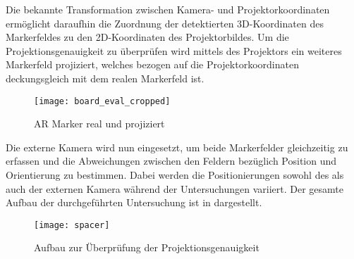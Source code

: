 Die bekannte Transformation zwischen Kamera- und Projektorkoordinaten ermöglicht daraufhin die Zuordnung der detektierten 3D-Koordinaten des Markerfeldes zu den 2D-Koordinaten des Projektorbildes. Um die Projektionsgenauigkeit zu überprüfen wird mittels des Projektors ein weiteres Markerfeld projiziert, welches bezogen auf die Projektorkoordinaten deckungsgleich mit dem realen Markerfeld ist. \\

\begin{figure}[!ht]
	\begin{center}
		\texttt{[image: board\_eval\_cropped]}
		\caption{AR Marker real und projiziert}
		\label{fig.arprojected}
	\end{center}
\end{figure}

Die externe Kamera wird nun eingesetzt, um beide Markerfelder gleichzeitig zu erfassen und die Abweichungen zwischen den Feldern bezüglich Position und Orientierung zu bestimmen. Dabei werden die Positionierungen sowohl des  als auch der externen Kamera während der Untersuchungen variiert. Der gesamte Aufbau der durchgeführten Untersuchung ist in  dargestellt.

\begin{figure}[!ht]
	\begin{center}
		\texttt{[image: spacer]}
		\caption{Aufbau zur Überprüfung der Projektionsgenauigkeit}
		\label{fig.projsetup}
	\end{center}
\end{figure}

\red[Die Ergebnisse der $n=6$ Messreihen sind als Box-Whisker-Plot in \abb{fig.boxplot_proj} dargestellt.]






%
